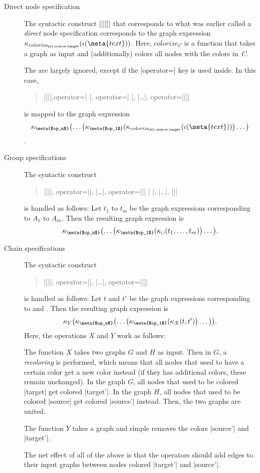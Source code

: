 \begin{description}
\item[Direct node specification] The syntactic construct
  |[||]| that corresponds to what was earlier
  called a \emph{direct} node specification corresponds to the 
  graph expression
  $\kappa_{\mathit{colorize}_{\mathtt{all},\mathtt{source},\mathtt{target}}}
  (\iota(\meta{text}))$. Here, $\mathit{colorize}_C$ is a function
  that takes a graph as input and (additionally) colors all nodes with
  the colors in~$C$.

  The  are largely ignored, except if the
  |operator=| key is used inside. In this case, 
  \begin{quote}
    |[||,operator=|%
    |, operator=|%
    |, |\dots|, operator=||]|
  \end{quote}
  is mapped to the graph expression 
  $$\kappa_{\meta{$op_n$}}\bigl(\dots\bigr(\kappa_{\meta{$op_1$}}(
  \kappa_{\mathit{colorize}_{\mathtt{all},\mathtt{source},\mathtt{target}}}(\iota(\meta{text}))\bigr)\dots\bigr)$$.  
\item[Group specifications] The syntactic construct
  \begin{quote}
    |{[||, operator=||, |\dots|, operator=||] |
      |, |\dots|, ||}|
  \end{quote}
  is handled as follows: Let $t_1$ to $t_m$ be the graph expressions
  corresponding to $A_1$ to $A_m$. Then the resulting graph expression
  is 
  $$\kappa_{\meta{$op_n$}}\bigl(\dots\bigr(\kappa_{\meta{$op_1$}}(\kappa_\cup(t_1,\dots,t_m)\bigr)\dots\bigr).$$ 
\item [Chain specifications]
  The syntactic construct
  \begin{quote}
     |[||, operator=||, |\dots|, operator=||]|
  \end{quote}
  is handled as follows: Let $t$ and $t'$ be the graph expressions
  corresponding to  and . Then the resulting graph
  expression is
  $$\kappa_Y\bigl(\kappa_{\meta{$op_n$}}\bigl(\dots\bigr(\kappa_{\meta{$op_1$}}(\kappa_X(t,t')\bigr)\dots\bigr)\bigr).$$
  Here, the operations $X$ and $Y$ work as follows:

  The function $X$ takes two graphs $G$ and $H$ as input. Then in $G$, a
  \emph{recoloring} is performed, which means that all nodes that used
  to have a certain color get a new color instead (if they has
  additional colors, these remain unchanged). In the graph $G$, all
  nodes that used to be colored |target| get colored |target'|. In the
  graph $H$, all nodes that used to be colored |source| get colored
  |source'| instead. Then, the two graphs are united.

  The function $Y$ takes a graph and simple removes the colors
  |source'| and |target'|.

  The net effect of all of the above is that the operators 
  should add edges to their input graphs between nodes colored
  |target'| and |source'|.
\end{description}

